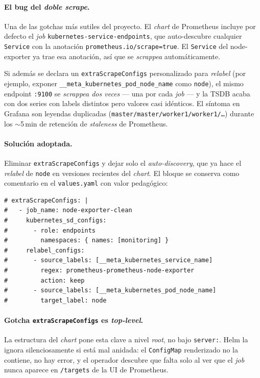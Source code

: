 \paragraph{El bug del \emph{doble \emph{scrape}}.} Una de las gotchas más sutiles del proyecto. El \emph{chart} de Prometheus incluye por defecto el \emph{job} \texttt{kubernetes-service-endpoints}, que auto-descubre cualquier \texttt{Service} con la anotación \texttt{prometheus.io/scrape=true}. El \texttt{Service} del node-exporter ya trae esa anotación, así que se \emph{scrappea} automáticamente.

Si además se declara un \texttt{extraScrapeConfigs} personalizado para \emph{relabel} (por ejemplo, exponer \texttt{\_\_meta\_kubernetes\_pod\_node\_name} como \texttt{node}), el mismo endpoint \texttt{:9100} se \emph{scrappea dos veces} --- una por cada \emph{job} --- y la TSDB acaba con dos series con labels distintos pero valores casi idénticos. El síntoma en Grafana son leyendas duplicadas (\texttt{master/master/worker1/worker1/\dots}) durante los $\sim$5\,min de retención de \emph{staleness} de Prometheus.

\paragraph{Solución adoptada.} Eliminar \texttt{extraScrapeConfigs} y dejar solo el \emph{auto-discovery}, que ya hace el \emph{relabel} de \texttt{node} en versiones recientes del \emph{chart}. El bloque se conserva como comentario en el \texttt{values.yaml} con valor pedagógico:

\begin{lstlisting}[style=bash]
# extraScrapeConfigs: |
#   - job_name: node-exporter-clean
#     kubernetes_sd_configs:
#       - role: endpoints
#         namespaces: { names: [monitoring] }
#     relabel_configs:
#       - source_labels: [__meta_kubernetes_service_name]
#         regex: prometheus-prometheus-node-exporter
#         action: keep
#       - source_labels: [__meta_kubernetes_pod_node_name]
#         target_label: node
\end{lstlisting}

\paragraph{Gotcha \texttt{extraScrapeConfigs} es \emph{top-level}.} La estructura del \emph{chart} pone esta clave a nivel \emph{root}, no bajo \texttt{server:}. Helm la ignora silenciosamente si está mal anidada: el \texttt{ConfigMap} renderizado no la contiene, no hay error, y el operador descubre que falta solo al ver que el \emph{job} nunca aparece en \texttt{/targets} de la UI de Prometheus.

